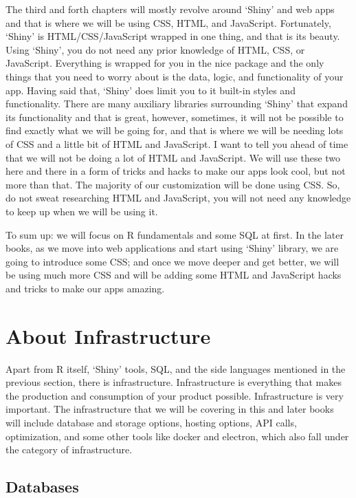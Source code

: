 \documentclass[]{book}
\begin{document}
The third and forth chapters will mostly revolve around `Shiny' and web apps and that is where we will be using CSS, HTML, and JavaScript. Fortunately, `Shiny' is HTML/CSS/JavaScript wrapped in one thing, and that is its beauty. Using `Shiny', you do not need any prior knowledge of HTML, CSS, or JavaScript. Everything is wrapped for you in the nice package and the only things that you need to worry about is the data, logic, and functionality of your app. Having said that, `Shiny' does limit you to it built-in styles and functionality. There are many auxiliary libraries surrounding `Shiny' that expand its functionality and that is great, however, sometimes, it will not be possible to find exactly what we will be going for, and that is where we will be needing lots of CSS and a little bit of HTML and JavaScript. I want to tell you ahead of time that we will not be doing a lot of HTML and JavaScript. We will use these two here and there in a form of tricks and hacks to make our apps look cool, but not more than that. The majority of our customization will be done using CSS. So, do not sweat researching HTML and JavaScript, you will not need any knowledge to keep up when we will be using it.

To sum up: we will focus on R fundamentals and some SQL at first. In the later books, as we move into web applications and start using `Shiny' library, we are going to introduce some CSS; and once we move deeper and get better, we will be using much more CSS and will be adding some HTML and JavaScript hacks and tricks to make our apps amazing.

\hypertarget{about-infrastructure}{%
\section{About Infrastructure}\label{about-infrastructure}}

Apart from R itself, `Shiny' tools, SQL, and the side languages mentioned in the previous section, there is infrastructure. Infrastructure is everything that makes the production and consumption of your product possible. Infrastructure is very important. The infrastructure that we will be covering in this and later books will include database and storage options, hosting options, API calls, optimization, and some other tools like docker and electron, which also fall under the category of infrastructure.

\hypertarget{databases}{%
\subsection{Databases}\label{databases}}
\end{document}
